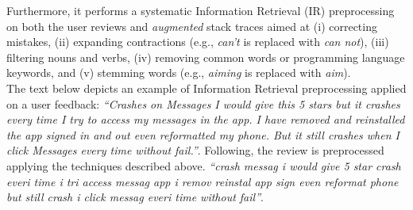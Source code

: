 Furthermore, it performs a systematic Information Retrieval (IR) preprocessing \cite{BaezaYates:1999} on both the user reviews and \textit{augmented} stack traces aimed at (i) correcting mistakes, (ii) expanding contractions (e.g., \textit{can’t} is replaced with \textit{can not}), (iii) filtering nouns and verbs, (iv) removing common words or programming language keywords, and (v) stemming words (e.g., \textit{aiming} is replaced with \textit{aim}). \\
The text below depicts an example of Information Retrieval preprocessing applied on a user feedback: 
\smallbreak
\emph{\small``Crashes on Messages I would give this 5 stars but it crashes every time I try to access my messages in the app. I have removed and reinstalled the app  signed in and out  even reformatted my phone. But it still crashes when I click Messages  every time without fail.''}. 
\smallbreak
Following, the review is preprocessed applying the techniques described above.  
\smallbreak
\emph{\small``crash messag i would give 5 star crash everi time i tri access messag app i remov reinstal app  sign  even reformat phone but still crash i click messag  everi time without fail''}. 
\smallbreak


